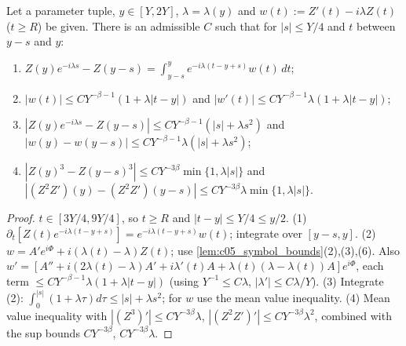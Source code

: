 \begin{lemma}
  \label{lem:c05_frozen_frequency}
  Let a parameter tuple, $y\in[Y,2Y]$, $\lambda=\lambda(y)$ and $w(t):=Z'(t)-i\lambda Z(t)$ ($t\ge R$) be given. There is an
  admissible $C$ such that for $|s|\le Y/4$ and $t$ between $y-s$ and $y$:
  \begin{enumerate}
    \item \label{eqn:approx_Z_frozen_frequency_identity}
      $Z(y)e^{-i\lambda s}-Z(y-s)=\int_{y-s}^ye^{-i\lambda(t-y+s)}w(t)\,dt$;
    \item $|w(t)|\le CY^{-\beta-1}(1+\lambda|t-y|)$ and $|w'(t)|\le CY^{-\beta-1}\lambda(1+\lambda|t-y|)$;
    \item \label{eqn:approx_Z_plane_wave_comparison}
      $|Z(y)e^{-i\lambda s}-Z(y-s)|\le CY^{-\beta-1}(|s|+\lambda s^2)$ and $|w(y)-w(y-s)|\le CY^{-\beta-1}\lambda(|s|+\lambda s^2)$;
    \item $|Z(y)^3-Z(y-s)^3|\le CY^{-3\beta}\min\{1,\lambda|s|\}$ and
      $|(Z^2Z')(y)-(Z^2Z')(y-s)|\le CY^{-3\beta}\lambda\min\{1,\lambda|s|\}$.
  \end{enumerate}
\end{lemma}
\begin{proof}
  $t\in[3Y/4,9Y/4]$, so $t\ge R$ and $|t-y|\le Y/4\le y/2$. (1) $\partial_t[Z(t)e^{-i\lambda(t-y+s)}]=e^{-i\lambda(t-y+s)}w(t)$;
  integrate over $[y-s,y]$. (2) $w=A'e^{i\Phi}+i(\lambda(t)-\lambda)Z(t)$; use \cref{lem:c05_symbol_bounds}(2),(3),(6). Also
  $w'=[A''+i(2\lambda(t)-\lambda)A'+i\lambda'(t)A+\lambda(t)(\lambda-\lambda(t))A]e^{i\Phi}$, each term
  $\le CY^{-\beta-1}\lambda(1+\lambda|t-y|)$ (using $Y^{-1}\le C\lambda$, $|\lambda'|\le C\lambda/Y$). (3) Integrate (2):
  $\int_0^{|s|}(1+\lambda\tau)d\tau\le|s|+\lambda s^2$; for $w$ use the mean value inequality. (4) Mean value inequality with
  $|(Z^3)'|\le CY^{-3\beta}\lambda$, $|(Z^2Z')'|\le CY^{-3\beta}\lambda^2$, combined with the sup bounds $CY^{-3\beta}$, $CY^{-3\beta}\lambda$.
\end{proof}

